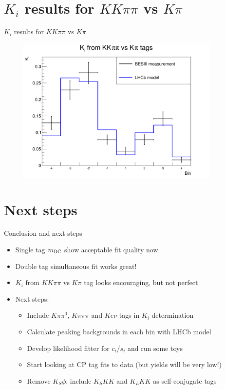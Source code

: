 \documentclass{beamer}
\begin{document}
\section{\texorpdfstring{$K_i$}{Ki} results for \texorpdfstring{$KK\pi\pi$}{KKpipi} vs \texorpdfstring{$K\pi$}{Kpi}}
\begin{frame}{$K_i$ results for $KK\pi\pi$ vs $K\pi$}
  \begin{figure}
    \centering
    \includegraphics[width=0.9\textwidth]{Plots/Kpi_Ki.png}
  \end{figure}
\end{frame}

\section{Next steps}
\begin{frame}{Conclusion and next steps}
  \begin{itemize}
    \setlength\itemsep{1.5em}
    \item{Single tag $m_{\rm BC}$ show acceptable fit quality now}
    \item{Double tag simultaneous fit works great!}
    \item{$K_i$ from $KK\pi\pi$ vs $K\pi$ tag looks encouraging, but not perfect}
    \item{Next steps:}
    \begin{itemize}
      \item{Include $K\pi\pi^0$, $K\pi\pi\pi$ and $Ke\nu$ tags in $K_i$ determination}
      \item{Calculate peaking backgrounds in each bin with LHCb model}
      \item{Develop likelihood fitter for $c_i$/$s_i$ and run some toys}
      \item{Start looking at CP tag fits to data (but yields will be very low!)}
      \item{Remove $K_S\phi$, include $K_SKK$ and $K_LKK$ as self-conjugate tags}
    \end{itemize}
  \end{itemize}
\end{frame}
\end{document}
